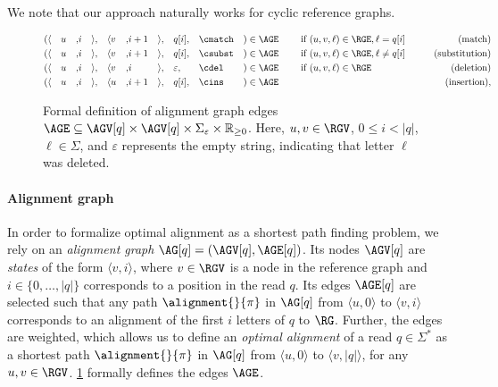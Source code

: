 We note that our approach naturally works for cyclic reference graphs.

\begin{figure}[t]
	\begin{alignat*}{20}
		(
			&\langle&& u &,& i   &\rangle&,
			&\langle&  v &,& i+1 &\rangle&,
			&&q[i],
			&&\cmatch
		&)&\in \AGE
		&& \quad \text{ if } (u,v,\ell) \in \RGE, \ell = q[i] & \qquad \text{(match)}\\
		(
			&\langle&& u &,& i   &\rangle&,
			&\langle&  v &,& i+1 &\rangle&,
			&&q[i],
			&&\csubst
		&) &\in \AGE
		&& \quad \text{ if } (u,v,\ell) \in \RGE, \ell \neq q[i] & \qquad \text{(substitution)}\\
		(
			&\langle&& u &,& i &\rangle&,
			&\langle&  v &,& i &\rangle&,
			&&\varepsilon,
			&&\cdel
		&) &\in \AGE
		&& \quad \text{ if } (u,v,\ell) \in \RGE & \qquad \text{(deletion)}\\
		(
			&\langle&& u &,& i   &\rangle&,
			&\langle&  u &,& i+1 &\rangle&,
			&&q[i],
			&&\cins
		&) &\in \AGE
		&& \quad & \qquad \text{(insertion)},
	\end{alignat*}
	\caption[Formal definition of alignment graph]{Formal definition of
	alignment graph edges $\AGE \subseteq \AGV[q] \times \AGV[q] \times
	\Sigma_\varepsilon \times \mathbb{R}_{\geq 0}$. Here, $u,v \in \RGV$, $0
	\leq i < |q|$, $\ell \in \Sigma$, and $\varepsilon$ represents the empty
	string, indicating that letter $\ell$ was deleted.}
	\label{SEEDfig:graph-edges}
\end{figure}

\paragraph{Alignment graph}
%
In order to formalize optimal alignment as a shortest path finding problem, we
rely on an \emph{alignment graph} $\AG[q]=(\AGV[q],\AGE[q])$.
%
Its nodes $\AGV[q]$ are \emph{states} of the form $\langle v, i \rangle$, where
$v \in \RGV$ is a node in the reference graph and $i \in \{0, \dots, |q|\}$
corresponds to a position in the read $q$.
%
Its edges $\AGE[q]$ are selected such that any path $\alignment{}{\pi}$ in
$\AG[q]$ from $\langle u, 0 \rangle$ to $\langle v, i \rangle$ corresponds to an
alignment of the first $i$ letters of $q$ to $\RG$.
%
Further, the edges are weighted, which allows us to define an \emph{optimal
alignment} of a read $q \in \Sigma^*$ as a shortest path $\alignment{}{\pi}$ in
$\AG[q]$ from $\langle u, 0 \rangle$ to $\langle v, |q| \rangle$, for any $u, v
\in \RGV$.
%
\cref{SEEDfig:graph-edges} formally defines the edges $\AGE$.

